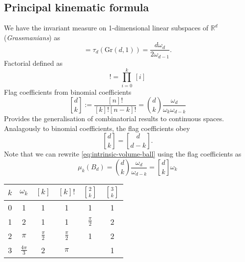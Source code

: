 
\subsection{Principal kinematic formula}

We have the invariant measure on 1-dimensional linear subspaces of $\mathbb{R}^d$ (\emph{Grassmanians}) as
\begin{equation}
  [d] = \tau_d(\textrm{Gr}(d,1))
  = \frac{d \omega_d}{2 \omega_{d-1}}.
\end{equation}
Factorial defined as
\begin{equation}
  [k]! = \prod_{i=0}^k \, [i]
\end{equation}
Flag coefficients from binomial coefficients
\begin{equation}
  {d \brack k}
  := \frac{[n]!}{[k]! [n-k]!}
  = {d \choose k}
  \frac{\omega_d}{\omega_k \omega_{d-k}}
\end{equation}
Provides the generalisation of combinatorial results to continuous spaces.
Analagously to binomial coefficients, the flag coefficients obey
\begin{equation}\label{eq:flag-coefficients-symmetry}
  {d \brack k} = {d \brack d - k}.
\end{equation}
Note that we can rewrite \eqref{eq:intrinsic-volume-ball} using the flag coefficients as
\begin{equation}\label{eq:intrinsic-volume-ball-flag}
  \mu_k (B_d) = {d \choose k} \frac{\omega_d}{\omega_{d-k}}
  = {d \brack k} \omega_k
\end{equation}

\begin{center}
\begin{tabular}{cccccc}
  \toprule
  $k$ & $\omega_k$ & $[k]$ & $[k]!$ & ${2 \brack k}$ & ${3 \brack k}$ \\
  \midrule
  0 & 1 & 1 & 1 & 1 & 1 \\
  1 & 2 & 1 & 1 & $\frac{\pi}{2}$ & 2 \\
  2 & $\pi$ & $\frac{\pi}{2}$ & $\frac{\pi}{2}$ & 1 & 2 \\
  3 & $\frac{4\pi}{3}$ & 2 & $\pi$ & & 1 \\
  \bottomrule
\end{tabular}
\end{center}

